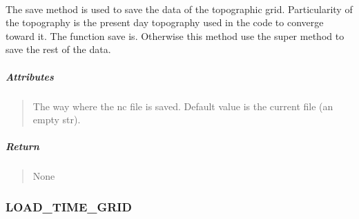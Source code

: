 \documentclass[letterpaper,10pt,english]{sphinxmanual}
\begin{document}
\paragraph{}
\label{\detokenize{GRID_doc/TOPOGRAPHIC_TIME_GRID_doc:id2}}

\begin{fulllineitems}
\label{\detokenize{GRID_doc/TOPOGRAPHIC_TIME_GRID_doc:SL_C0de.grid.TOPOGRAPHIC_TIME_GRID.save}}
\pysigstartsignatures
{}
\pysigstopsignatures{}\label{\detokenize{GRID_doc/TOPOGRAPHIC_TIME_GRID_doc:topo-save}}
\sphinxAtStartPar
The save method is used to save the data of the topographic grid. Particularity of the topography is the present day topography used in the code to converge toward it. The function save is. Otherwise this method use the super method  to save the rest of the data.


\subparagraph{Attributes}
\label{\detokenize{GRID_doc/TOPOGRAPHIC_TIME_GRID_doc:id3}}\begin{quote}
\begin{description}
\sphinxAtStartPar
The way where the nc file is saved. Default value is the current file (an empty str).

\end{description}
\end{quote}


\subparagraph{Return}
\label{\detokenize{GRID_doc/TOPOGRAPHIC_TIME_GRID_doc:return}}\begin{quote}

\sphinxAtStartPar
None
\end{quote}

\end{fulllineitems}


\sphinxstepscope


\subsubsection{LOAD\_TIME\_GRID}
\label{\detokenize{GRID_doc/LOAD_TIME_GRID_doc:load-time-grid}}\label{\detokenize{GRID_doc/LOAD_TIME_GRID_doc::doc}}
\end{document}
